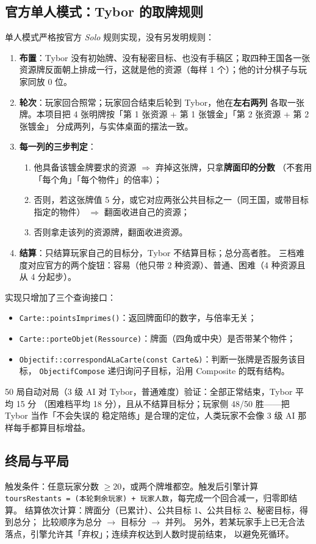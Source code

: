 \documentclass[11pt,a4paper]{ctexart}
\newcommand{\cl}[1]{\texttt{#1}}
\begin{document}
\subsection{官方单人模式：Tybor 的取牌规则}
单人模式严格按官方 \emph{Solo} 规则实现，没有另发明规则：
\begin{enumerate}
\item \textbf{布置}：Tybor 没有初始牌、没有秘密目标、也没有手稿区；取四种王国各一张
      资源牌反面朝上排成一行，这就是他的资源（每样 1 个）；他的计分棋子与玩家同放 0 位。
\item \textbf{轮次}：玩家回合照常；玩家回合结束后轮到 Tybor，他在\textbf{左右两列}
      各取一张牌。本项目把 4 张明牌按「第 1 张资源 + 第 1 张镀金」「第 2 张资源 + 第 2 张镀金」
      分成两列，与实体桌面的摆法一致。
\item \textbf{每一列的三步判定}：
      \begin{enumerate}
      \item 他具备该镀金牌要求的资源 $\Rightarrow$ 弃掉这张牌，只拿\textbf{牌面印的分数}
            （不套用「每个角」「每个物件」的倍率）；
      \item 否则，若这张牌值 5 分，或它对应两张公共目标之一（同王国，或带目标指定的物件）
            $\Rightarrow$ 翻面收进自己的资源；
      \item 否则拿走该列的资源牌，翻面收进资源。
      \end{enumerate}
\item \textbf{结算}：只结算玩家自己的目标分，Tybor 不结算目标；总分高者胜。
      三档难度对应官方的两个旋钮：容易（他只带 2 种资源）、普通、困难（4 种资源且从 4 分起步）。
\end{enumerate}
实现只增加了三个查询接口：
\begin{itemize}
\item \cl{Carte::pointsImprimes()}：返回牌面印的数字，与倍率无关；
\item \cl{Carte::porteObjet(Ressource)}：牌面（四角或中央）是否带某个物件；
\item \cl{Objectif::correspondALaCarte(const Carte\&)}：判断一张牌是否服务该目标，
      \cl{ObjectifCompose} 递归询问子目标，沿用 Composite 的既有结构。
\end{itemize}
50 局自动对局（3 级 AI 对 Tybor，普通难度）验证：全部正常结束，Tybor 平均 15 分
（困难档平均 18 分），且从不结算目标分；玩家侧 48/50 胜——把 Tybor 当作「不会失误的
稳定陪练」是合理的定位，人类玩家不会像 3 级 AI 那样每手都算目标增益。

\subsection{终局与平局}
触发条件：任意玩家分数 $\ge 20$，或两个牌堆都空。触发后引擎计算
\cl{toursRestants = (本轮剩余玩家) + 玩家人数}，每完成一个回合减一，归零即结算。
结算依次计算：牌面分（已累计）、公共目标 1、公共目标 2、秘密目标，得到总分；
比较顺序为总分 $\rightarrow$ 目标分 $\rightarrow$ 并列。
另外，若某玩家手上已无合法落点，引擎允许其「弃权」；连续弃权达到人数时提前结束，
以避免死循环。
\end{document}
